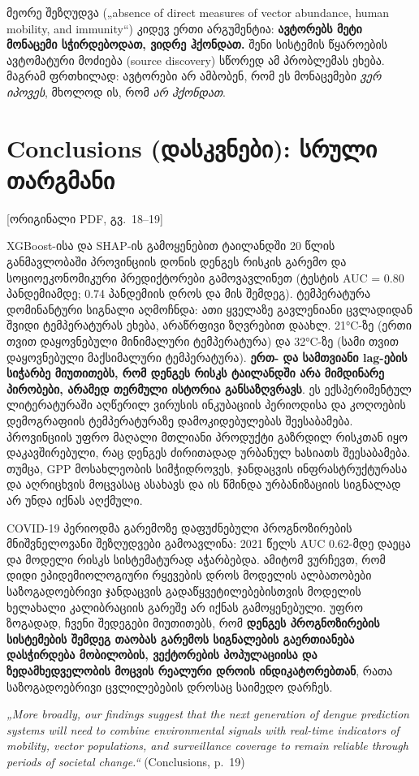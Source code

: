 \documentclass[11pt,a4paper]{article}
\newcommand{\imp}[1]{\textbf{\color{importred}#1}}
\newcommand{\pg}[1]{{\small\color{gray}[ორიგინალი PDF, გვ.~#1]}}
\begin{document}
\begin{etl}
მეორე შეზღუდვა („absence of direct measures of vector abundance, human mobility, and immunity“) კიდევ ერთი
არგუმენტია: \imp{ავტორებს მეტი მონაცემი სჭირდებოდათ, ვიდრე ჰქონდათ.} შენი სისტემის წყაროების ავტომატური
მოძიება (source discovery) სწორედ ამ პრობლემას ეხება. მაგრამ ფრთხილად: ავტორები არ ამბობენ, რომ ეს
მონაცემები \textit{ვერ იპოვეს}, მხოლოდ ის, რომ \textit{არ ჰქონდათ}.
\end{etl}

\section{Conclusions (დასკვნები): სრული თარგმანი} \pg{18--19}

XGBoost-ისა და SHAP-ის გამოყენებით ტაილანდში 20 წლის განმავლობაში პროვინციის დონის დენგეს რისკის
გარემო და სოციოეკონომიკური პრედიქტორები გამოვავლინეთ (ტესტის AUC = 0.80 პანდემიამდე; 0.74 პანდემიის
დროს და მის შემდეგ). ტემპერატურა დომინანტური სიგნალი აღმოჩნდა: ათი ყველაზე გავლენიანი ცვლადიდან შვიდი
ტემპერატურას ეხება, არაწრფივი ზღვრებით დაახლ. 21°C-ზე (ერთი თვით დაყოვნებული მინიმალური ტემპერატურა)
და 32°C-ზე (სამი თვით დაყოვნებული მაქსიმალური ტემპერატურა). \imp{ერთ- და სამთვიანი lag-ების სიჭარბე
მიუთითებს, რომ დენგეს რისკს ტაილანდში არა მიმდინარე პირობები, არამედ თერმული ისტორია განსაზღვრავს}.
ეს ექსპერიმენტულ ლიტერატურაში აღწერილ ვირუსის ინკუბაციის პერიოდისა და კოღოების დემოგრაფიის
ტემპერატურაზე დამოკიდებულებას შეესაბამება. პროვინციის უფრო მაღალი მთლიანი პროდუქტი გაზრდილ რისკთან იყო
დაკავშირებული, რაც დენგეს ძირითადად ურბანულ ხასიათს შეესაბამება. თუმცა, GPP მოსახლეობის სიმჭიდროვეს,
ჯანდაცვის ინფრასტრუქტურასა და აღრიცხვის მოცვასაც ასახავს და ის წმინდა ურბანიზაციის სიგნალად არ უნდა
იქნას აღქმული.

COVID-19 პერიოდმა გარემოზე დაფუძნებული პროგნოზირების მნიშვნელოვანი შეზღუდვები გამოავლინა: 2021 წელს
AUC 0.62-მდე დაეცა და მოდელი რისკს სისტემატურად აჭარბებდა. ამიტომ ვურჩევთ, რომ დიდი ეპიდემიოლოგიური
რყევების დროს მოდელის ალბათობები საზოგადოებრივი ჯანდაცვის გადაწყვეტილებებისთვის მოდელის ხელახალი
კალიბრაციის გარეშე არ იქნას გამოყენებული. უფრო ზოგადად, ჩვენი შედეგები მიუთითებს, რომ
\imp{დენგეს პროგნოზირების სისტემების შემდეგ თაობას გარემოს სიგნალების გაერთიანება დასჭირდება მობილობის,
ვექტორების პოპულაციისა და ზედამხედველობის მოცვის რეალური დროის ინდიკატორებთან}, რათა საზოგადოებრივი
ცვლილებების დროსაც საიმედო დარჩეს.

\begin{citat}
\textit{„More broadly, our findings suggest that the next generation of dengue prediction systems will need to combine environmental signals with real-time indicators of mobility, vector populations, and surveillance coverage to remain reliable through periods of societal change.“} (Conclusions, p.~19)
\end{citat}
\end{document}
